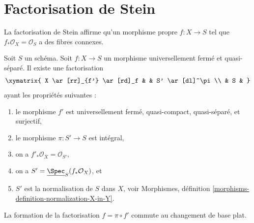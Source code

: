 \section{Factorisation de Stein}
\label{section-stein-factorization}

\noindent
La factorisation de Stein affirme qu'un morphisme propre $f : X \to S$
tel que $f_*\mathcal{O}_X = \mathcal{O}_S$ a des fibres connexes.

\begin{lemma}
\label{lemma-stein-universally-closed}
Soit $S$ un schéma. Soit $f : X \to S$ un morphisme universellement fermé et
quasi-séparé. Il existe une factorisation
$$
\xymatrix{
X \ar[rr]_{f'} \ar[rd]_f & & S' \ar[dl]^\pi \\
& S &
}
$$
ayant les propriétés suivantes :
\begin{enumerate}
\item le morphisme $f'$ est universellement fermé, quasi-compact, quasi-séparé,
et surjectif,
\item le morphisme $\pi : S' \to S$ est intégral,
\item on a $f'_*\mathcal{O}_X = \mathcal{O}_{S'}$,
\item on a $S' = \underline{\Spec}_S(f_*\mathcal{O}_X)$, et
\item $S'$ est la normalisation de $S$ dans $X$, voir
Morphismes, définition \ref{morphisms-definition-normalization-X-in-Y}.
\end{enumerate}
La formation de la factorisation $f = \pi \circ f'$ commute
au changement de base plat.
\end{lemma}

